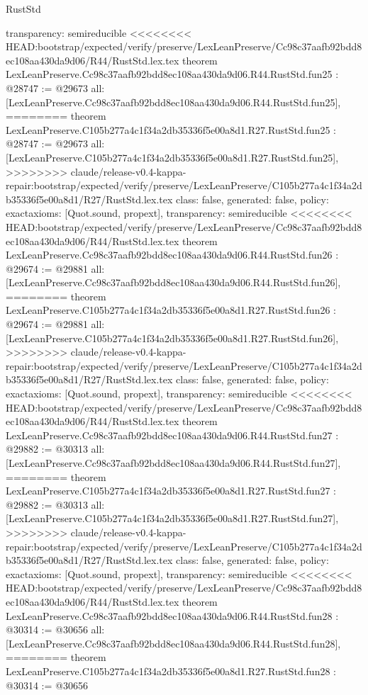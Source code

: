 \begin{lexlean}{RustStd}
\begin{coremodule}
{\begin{coremodule}
{{{{{{{{{{{{{{{{{{{{{{{{{{{{  transparency: semireducible
}
<<<<<<<< HEAD:bootstrap/expected/verify/preserve/LexLeanPreserve/Cc98c37aafb92bdd8ec108aa430da9d06/R44/RustStd.lex.tex
theorem LexLeanPreserve.Cc98c37aafb92bdd8ec108aa430da9d06.R44.RustStd.fun25 : @28747 := @29673 {
  all: [LexLeanPreserve.Cc98c37aafb92bdd8ec108aa430da9d06.R44.RustStd.fun25],
========
theorem LexLeanPreserve.C105b277a4c1f34a2db35336f5e00a8d1.R27.RustStd.fun25 : @28747 := @29673 {
  all: [LexLeanPreserve.C105b277a4c1f34a2db35336f5e00a8d1.R27.RustStd.fun25],
>>>>>>>> claude/release-v0.4-kappa-repair:bootstrap/expected/verify/preserve/LexLeanPreserve/C105b277a4c1f34a2db35336f5e00a8d1/R27/RustStd.lex.tex
  class: false,
  generated: false,
  policy: exact{axioms: [Quot.sound, propext]},
  transparency: semireducible
}
<<<<<<<< HEAD:bootstrap/expected/verify/preserve/LexLeanPreserve/Cc98c37aafb92bdd8ec108aa430da9d06/R44/RustStd.lex.tex
theorem LexLeanPreserve.Cc98c37aafb92bdd8ec108aa430da9d06.R44.RustStd.fun26 : @29674 := @29881 {
  all: [LexLeanPreserve.Cc98c37aafb92bdd8ec108aa430da9d06.R44.RustStd.fun26],
========
theorem LexLeanPreserve.C105b277a4c1f34a2db35336f5e00a8d1.R27.RustStd.fun26 : @29674 := @29881 {
  all: [LexLeanPreserve.C105b277a4c1f34a2db35336f5e00a8d1.R27.RustStd.fun26],
>>>>>>>> claude/release-v0.4-kappa-repair:bootstrap/expected/verify/preserve/LexLeanPreserve/C105b277a4c1f34a2db35336f5e00a8d1/R27/RustStd.lex.tex
  class: false,
  generated: false,
  policy: exact{axioms: [Quot.sound, propext]},
  transparency: semireducible
}
<<<<<<<< HEAD:bootstrap/expected/verify/preserve/LexLeanPreserve/Cc98c37aafb92bdd8ec108aa430da9d06/R44/RustStd.lex.tex
theorem LexLeanPreserve.Cc98c37aafb92bdd8ec108aa430da9d06.R44.RustStd.fun27 : @29882 := @30313 {
  all: [LexLeanPreserve.Cc98c37aafb92bdd8ec108aa430da9d06.R44.RustStd.fun27],
========
theorem LexLeanPreserve.C105b277a4c1f34a2db35336f5e00a8d1.R27.RustStd.fun27 : @29882 := @30313 {
  all: [LexLeanPreserve.C105b277a4c1f34a2db35336f5e00a8d1.R27.RustStd.fun27],
>>>>>>>> claude/release-v0.4-kappa-repair:bootstrap/expected/verify/preserve/LexLeanPreserve/C105b277a4c1f34a2db35336f5e00a8d1/R27/RustStd.lex.tex
  class: false,
  generated: false,
  policy: exact{axioms: [Quot.sound, propext]},
  transparency: semireducible
}
<<<<<<<< HEAD:bootstrap/expected/verify/preserve/LexLeanPreserve/Cc98c37aafb92bdd8ec108aa430da9d06/R44/RustStd.lex.tex
theorem LexLeanPreserve.Cc98c37aafb92bdd8ec108aa430da9d06.R44.RustStd.fun28 : @30314 := @30656 {
  all: [LexLeanPreserve.Cc98c37aafb92bdd8ec108aa430da9d06.R44.RustStd.fun28],
========
theorem LexLeanPreserve.C105b277a4c1f34a2db35336f5e00a8d1.R27.RustStd.fun28 : @30314 := @30656 {
}}}}}}}}}}}}}}}}}}}}}}}}}}}}}}}}
\end{coremodule}}
\end{coremodule}
\end{lexlean}
